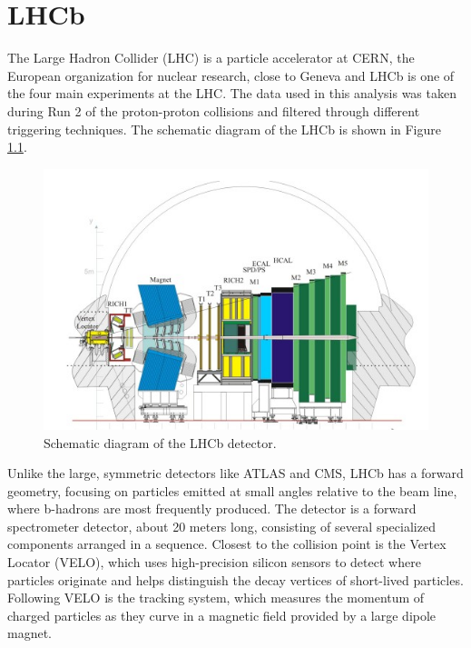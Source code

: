 \chapter{LHCb}

The Large Hadron Collider (LHC) is a particle accelerator at CERN, the European
organization for nuclear research, close to Geneva and LHCb is one of the four main experiments at the LHC. The data used in this analysis was taken during Run 2 of the proton-proton collisions and filtered through different triggering techniques. The schematic diagram of the LHCb is shown in Figure \ref{LHCb}.\\

\begin{figure}[H]
    \centering
    \includegraphics[width=0.8\linewidth]{Figure/LHCb.jpg}
    \caption{Schematic diagram of the LHCb detector.}
    \label{LHCb}
\end{figure}

Unlike the large, symmetric detectors like ATLAS and CMS, LHCb has a forward geometry, focusing on particles emitted at small angles relative to the beam line, where b-hadrons are most frequently produced. The detector is a forward spectrometer detector, about 20 meters long, consisting of several specialized components arranged in a sequence. Closest to the collision point is the Vertex Locator (VELO), which uses high-precision silicon sensors to detect where particles originate and helps distinguish the decay vertices of short-lived particles. Following VELO is the tracking system, which measures the momentum of charged particles as they curve in a magnetic field provided by a large dipole magnet.\\

